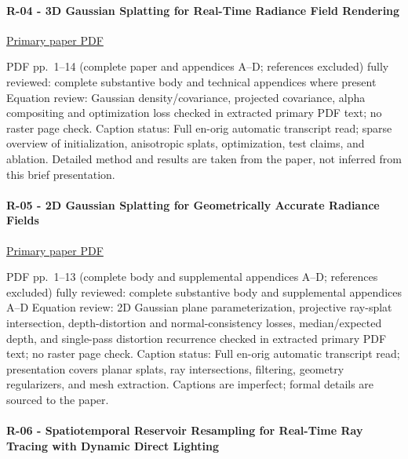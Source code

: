 \paragraph{R-04 - 3D Gaussian Splatting for Real-Time Radiance Field Rendering}\label{r-04---3d-gaussian-splatting-for-real-time-radiance-field-rendering}

\href{https://repo-sam.inria.fr/fungraph/3d-gaussian-splatting/3d_gaussian_splatting_low.pdf}{Primary paper PDF}

PDF pp.~1--14 (complete paper and appendices A--D; references excluded) fully reviewed: complete substantive body and technical appendices where present Equation review: Gaussian density/covariance, projected covariance, alpha compositing and optimization loss checked in extracted primary PDF text; no raster page check. Caption status: Full en-orig automatic transcript read; sparse overview of initialization, anisotropic splats, optimization, test claims, and ablation. Detailed method and results are taken from the paper, not inferred from this brief presentation.

\paragraph{R-05 - 2D Gaussian Splatting for Geometrically Accurate Radiance Fields}\label{r-05---2d-gaussian-splatting-for-geometrically-accurate-radiance-fields}

\href{https://arxiv.org/pdf/2403.17888}{Primary paper PDF}

PDF pp.~1--13 (complete body and supplemental appendices A--D; references excluded) fully reviewed: complete substantive body and supplemental appendices A--D Equation review: 2D Gaussian plane parameterization, projective ray-splat intersection, depth-distortion and normal-consistency losses, median/expected depth, and single-pass distortion recurrence checked in extracted primary PDF text; no raster page check. Caption status: Full en-orig automatic transcript read; presentation covers planar splats, ray intersections, filtering, geometry regularizers, and mesh extraction. Captions are imperfect; formal details are sourced to the paper.

\paragraph{R-06 - Spatiotemporal Reservoir Resampling for Real-Time Ray Tracing with Dynamic Direct Lighting}\label{r-06---spatiotemporal-reservoir-resampling-for-real-time-ray-tracing-with-dynamic-direct-lighting}

